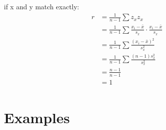 \documentclass{exam}
\begin{document}
  if x and y match exactly:
  \begin{align*}
    r & = \frac{1}{n - 1} \sum z_x z_x \\
      & = \frac{1}{n - 1} \sum \frac{x_i - \bar{x}}{s_x} \cdot \frac{x_i - \bar{x}}{s_x} \\
      & = \frac{1}{n - 1} \sum \frac{(x_i - \bar{x})^2}{s_x^2} \\
      & = \frac{1}{n - 1} \sum \frac{(n - 1) s_x^2}{s_x^2} \\
      & = \frac{n - 1}{n - 1} \\
      & = 1 \\
  \end{align*}

  \section{Examples}
\end{document}
